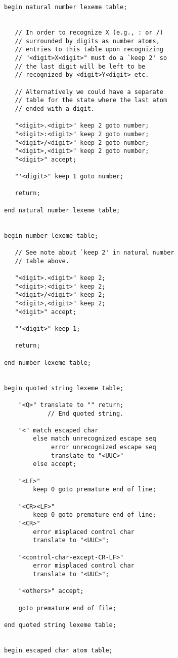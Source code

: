 \documentclass[12pt]{article}
\newenvironment{indpar}[1][0.3in]%
	{\begin{list}{}%
		     {\setlength{\itemsep}{0in}%
		      \setlength{\topsep}{0in}%
		      \setlength{\parsep}{1ex}%
		      \setlength{\labelwidth}{#1}%
		      \setlength{\leftmargin}{#1}%
		      \addtolength{\leftmargin}{\labelsep}}%
	 \item}%
	{\end{list}}
\begin{document}
\begin{indpar}
\begin{verbatim}
begin natural number lexeme table;


   // In order to recognize X (e.g., : or /)
   // surrounded by digits as number atoms,
   // entries to this table upon recognizing
   // "<digit>X<digit>" must do a `keep 2' so
   // the last digit will be left to be
   // recognized by <digit>Y<digit> etc.

   // Alternatively we could have a separate
   // table for the state where the last atom
   // ended with a digit.

   "<digit>.<digit>" keep 2 goto number;
   "<digit>:<digit>" keep 2 goto number;
   "<digit>/<digit>" keep 2 goto number;
   "<digit>,<digit>" keep 2 goto number;
   "<digit>" accept;

   "'<digit>" keep 1 goto number;

   return;

end natural number lexeme table;


begin number lexeme table;

   // See note about `keep 2' in natural number
   // table above.

   "<digit>.<digit>" keep 2;
   "<digit>:<digit>" keep 2;
   "<digit>/<digit>" keep 2;
   "<digit>,<digit>" keep 2;
   "<digit>" accept;

   "'<digit>" keep 1;

   return;

end number lexeme table;


begin quoted string lexeme table;

    "<Q>" translate to "" return;
            // End quoted string.

    "<" match escaped char
        else match unrecognized escape seq
             error unrecognized escape seq
             translate to "<UUC>"
        else accept;

    "<LF>"
        keep 0 goto premature end of line;

    "<CR><LF>"
        keep 0 goto premature end of line;
    "<CR>"
        error misplaced control char
        translate to "<UUC>";

    "<control-char-except-CR-LF>"
        error misplaced control char
        translate to "<UUC>";

    "<others>" accept;

    goto premature end of file;

end quoted string lexeme table;


begin escaped char atom table;


\end{verbatim}
\end{indpar}
\end{document}
